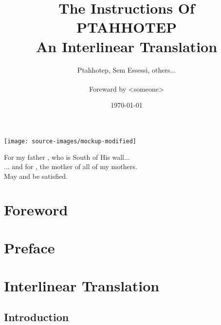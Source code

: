 \documentclass[a4paper,pagesize,8pt,pointlessnumbers,normalheadings]{book}
\title{
	\Large The Instructions Of\\
	\Huge \textbf{PTAHHOTEP}\\
	\vspace{2mm}
	\normalsize An Interlinear Translation}
\author{Ptahhotep, Sem Essessi, others...\\\\Foreward by <someone>}
\date{\today}
\begin{document}
\maketitle

\clearpage
\vspace*{\fill}
\clearpage

\vspace*{\fill}
\begin{center}
\texttt{[image: source-images/mockup-modified]}
\end{center}
\vspace*{\fill}
\pagebreak

\clearpage
\vspace*{\fill}
\clearpage

\vspace*{\fill}
\begin{center}
For my father , who is South of His wall...\\
\vspace{7.5mm}
... and for , the mother of all of my mothers.\\
\vspace{15mm}
May  and  be satisfied.\\
\end{center}
\vspace*{\fill}

\tableofcontents

\markboth{}{}

\newlength\q
\setlength{}

\chapter*{Foreword}

\markboth{}{}

\chapter*{Preface}

\markboth{}{}

\chapter*{Interlinear Translation}
\vspace*{\fill}
\pagebreak
{}
\section*{Introduction}


\pagebreak

\printindex
\end{document}
